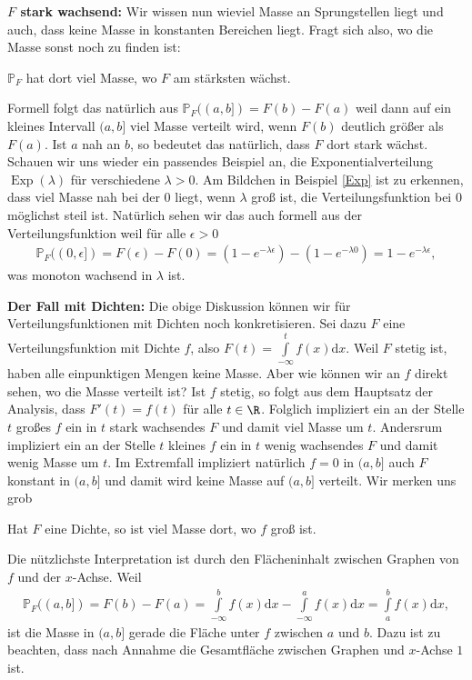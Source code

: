 \begin{disc}
	\textbf{$F$ stark wachsend:} Wir wissen nun wieviel Masse an Sprungstellen liegt und auch, dass keine Masse in konstanten Bereichen liegt. Fragt sich also, wo die Masse sonst noch zu finden ist: 
	\begin{center}
		\glqq $\mathbb{P}_F$ hat dort viel Masse, wo $F$ am st\"arksten wächst.\grqq
	\end{center}
	Formell folgt das nat\"urlich aus $\mathbb P_F((a,b])=F(b)-F(a)$ weil dann auf ein kleines Intervall $(a,b]$ viel Masse verteilt wird, wenn $F(b)$ deutlich gr\"o\ss er als $F(a)$. Ist $a$ nah an $b$, so bedeutet das nat\"urlich, dass $F$ dort stark w\"achst. Schauen wir uns wieder ein passendes Beispiel an, die Exponentialverteilung $\operatorname{Exp}(\lambda)$ f\"ur verschiedene $\lambda>0$. Am Bildchen in Beispiel \ref{Exp} ist zu erkennen, dass viel Masse nah bei der $0$ liegt, wenn $\lambda$ gro\ss{} ist, die Verteilungsfunktion bei $0$ m\"oglichst steil ist. Nat\"urlich sehen wir das auch formell aus der Verteilungsfunktion weil f\"ur alle $\epsilon>0$
\begin{align*}
	\mathbb P_F((0,\epsilon])=F(\epsilon)-F(0)= (1-e^{-\lambda \epsilon})-(1-e^{-\lambda 0})=1-e^{-\lambda \epsilon},
\end{align*}
	was monoton wachsend in $\lambda$ ist.\smallskip
	
	\textbf{Der Fall mit Dichten:} Die obige Diskussion k\"onnen wir f\"ur Verteilungsfunktionen mit Dichten noch konkretisieren. Sei dazu $F$ eine Verteilungsfunktion mit Dichte $f$, also $F(t) = \int\limits_{-\infty}^{t}  f(x) \mathrm{d}x$. Weil $F$ stetig ist, haben alle einpunktigen Mengen keine Masse. Aber wie k\"onnen wir an $f$ direkt sehen, wo die Masse verteilt ist? Ist $f$ stetig, so folgt aus dem Hauptsatz der Analysis, dass $F'(t)=f(t)$ f\"ur alle $t\in \R$. Folglich impliziert ein an der Stelle $t$ gro\ss es $f$ ein in $t$ stark wachsendes $F$ und damit viel Masse um $t$. Andersrum impliziert ein an der Stelle $t$ kleines $f$ ein in $t$ wenig wachsendes $F$ und damit wenig Masse um $t$. Im Extremfall impliziert nat\"urlich $f=0$ in $(a,b]$ auch $F$ konstant in $(a,b]$ und damit wird keine Masse auf $(a,b]$ verteilt. Wir merken uns grob 
	\begin{center}
		\glqq Hat $F$ eine Dichte, so ist viel Masse dort, wo $f$ gro\ss{} ist.\grqq
	\end{center}	
	 Die n\"utzlichste Interpretation ist durch den Fl\"acheninhalt zwischen Graphen von $f$ und der $x$-Achse. Weil	
		\begin{align*}
			\mathbb{P}_F((a,b]) 
			= F(b)-F(a)
			= \int\limits_{-\infty}^{b} f(x) \mathrm{d}x - \int\limits_{-\infty}^{a} f(x) \mathrm{d}x 
			=\int\limits_{a}^{b} f(x) \mathrm{d}x,
		\end{align*}
		ist die Masse in $(a,b]$ gerade die Fl\"ache unter $f$ zwischen $a$ und $b$. Dazu ist zu beachten, dass nach Annahme die Gesamtfl\"ache zwischen Graphen und $x$-Achse $1$ ist. 		
		

\end{disc}
